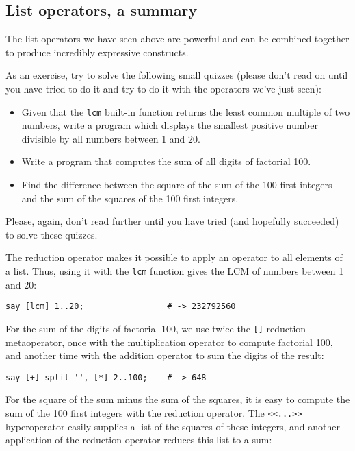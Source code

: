 \subsection{List operators, a summary}

The list operators we have seen above are powerful 
and can be combined together to produce incredibly 
expressive constructs.

As an exercise, try to solve the following small 
quizzes (please don't read on until you have tried 
to do it and try to do it with the operators we've 
just seen):

\begin{itemize}
\item Given that the {\tt lcm} built-in function 
returns the least common multiple of two numbers, 
write a program which displays the smallest positive 
number divisible by all numbers between 1 and 20.

\item Write a program that computes the sum of all 
digits of factorial 100.

\item Find the difference between the square of the sum 
of the 100 first integers and the sum of the squares of 
the 100 first integers.
\end{itemize}

Please, again, don't read further until you have tried 
(and hopefully succeeded) to solve these quizzes.

The reduction operator makes it possible to apply an 
operator to all elements of a list. Thus, using it 
with the {\tt lcm} function gives the LCM of numbers 
between 1 and 20:

\begin{verbatim}
say [lcm] 1..20;                 # -> 232792560
\end{verbatim}

For the sum of the digits of factorial 100, we use 
twice the \verb'[]' reduction metaoperator, once with 
the multiplication operator to compute factorial 100, 
and another time with the addition operator to sum 
the digits of the result:

\begin{verbatim}
say [+] split '', [*] 2..100;    # -> 648
\end{verbatim}

For the square of the sum minus the sum of the squares, 
it is easy to compute the sum of the 100 first integers 
with the reduction operator. The \verb'<<...>>' 
hyperoperator easily supplies a list of the squares of 
these integers, and another application of the reduction 
operator reduces this list to a sum:

